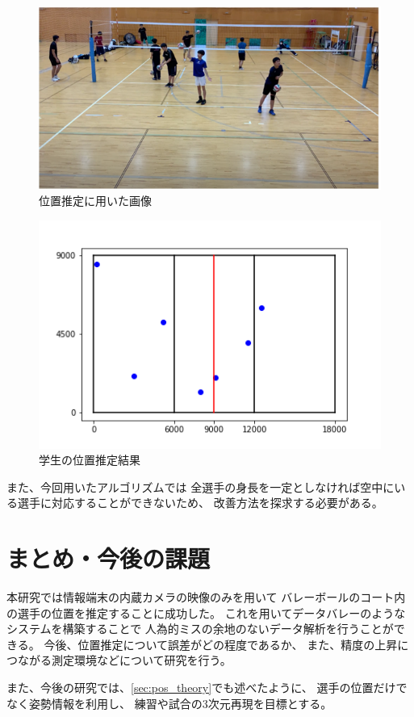 \documentclass[twoside,twocolumn]{jsarticle}
\begin{document}
		\begin{figure}[h]
			\centering
			\includegraphics[width=0.8\hsize]{volley_club.png}
			\caption{位置推定に用いた画像}
			\label{fig:volley_club}
		\end{figure}

		\begin{figure}[h]
			\centering
			\includegraphics[width=0.8\hsize]{pos.png}
			\caption{学生の位置推定結果}
			\label{fig:detection}
		\end{figure}

		また、今回用いたアルゴリズムでは
		全選手の身長を一定としなければ空中にいる選手に対応することができないため、
		改善方法を探求する必要がある。

\section{まとめ・今後の課題}
	本研究では情報端末の内蔵カメラの映像のみを用いて
	バレーボールのコート内の選手の位置を推定することに成功した。
	これを用いてデータバレーのようなシステムを構築することで
	人為的ミスの余地のないデータ解析を行うことができる。
	今後、位置推定について誤差がどの程度であるか、
	また、精度の上昇につながる測定環境などについて研究を行う。 

	また、今後の研究では、\ref{sec:pos_theory}でも述べたように、
	選手の位置だけでなく姿勢情報を利用し、
	練習や試合の3次元再現を目標とする。
\end{document}
